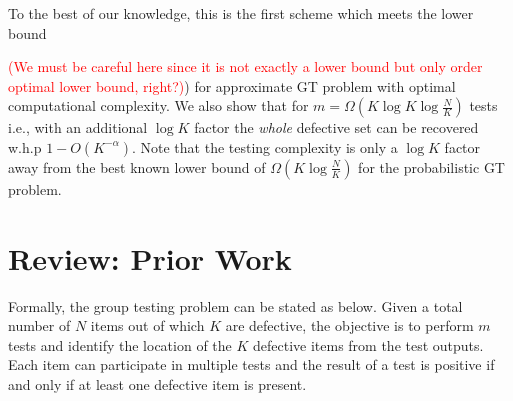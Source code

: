 \documentclass[conference,twocolumn]{IEEEtran}
\begin{document}
To the best of our knowledge, this is the first scheme which meets the lower bound {\textcolor{red}{(We must be careful here since it is not exactly a lower bound but only order optimal lower bound, right?)}) for approximate GT problem with optimal computational complexity. We also show that for $m=\Omega( K\log K \log \frac{N}{K})$ tests  i.e., with an additional $\log K$ factor the \textit{whole} defective set can be recovered w.h.p $1-O(K^{-\alpha})$. Note that the testing complexity is only a $\log K$ factor away from the best known lower bound of $\Omega(K\log \frac{N}{K})$ \cite{chan2014non} for the probabilistic GT problem.


\section{Review: Prior Work}
\label{Sec:PriorWork}
Formally, the group testing problem can be stated as below. Given a total number of $N$ items out of which $K$ are defective, the objective is to perform $m$ tests and identify the location of the $K$ defective items from the test outputs. Each item can participate in multiple tests and the result of a test is positive if and only if at least one defective item is present.

}
\end{document}
